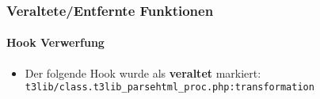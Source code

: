 %

\begin{frame}[fragile]
	\frametitle{Veraltete/Entfernte Funktionen}
	\framesubtitle{Hook Verwerfung}

	\begin{itemize}
		\item Der folgende Hook wurde als \textbf{veraltet} markiert:\newline
			\small
				\texttt{t3lib/class.t3lib\_parsehtml\_proc.php:transformation}
			\normalsize
	\end{itemize}

\end{frame}

